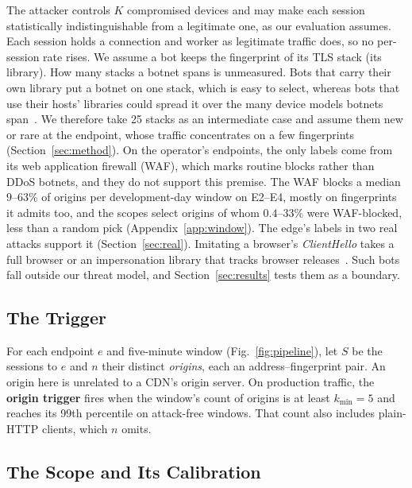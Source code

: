 \documentclass[conference,letterpaper,10pt]{IEEEtran}
\newcommand\1{\textit{(i)}}
\newcommand\2{\textit{(ii)}}
\newcommand\3{\textit{(iii)}}
\newcommand\4{\textit{(iv)}}
\newcommand\5{\textit{(v)}}
\newcommand\6{\textit{(vi)}}
\newcommand\7{\textit{(vii)}}
\newcommand\8{\textit{(viii)}}
\newcommand\9{\textit{(ix)}}
\begin{document}
The attacker controls $K$ compromised devices and
may make each session statistically indistinguishable
from a legitimate one, as our evaluation assumes. Each session holds a connection and worker as
legitimate traffic does, so no per-session rate rises. We assume a bot keeps the fingerprint of its TLS stack (its library). How many stacks a botnet spans is unmeasured. Bots that carry their own library put a botnet on one stack, which is easy to select, whereas bots that use their hosts' libraries could spread it over the many device models botnets span~\cite{antonakakis2017mirai}. We therefore take 25 stacks as an intermediate case and assume them new or rare at the endpoint, whose traffic concentrates on a few fingerprints (Section~\ref{sec:method}). On the operator's endpoints, the only labels come from its web application firewall (WAF), which marks routine blocks rather than DDoS botnets, and they do not support this premise. The WAF blocks a median $9$--$63\%$ of origins per development-day window on E2--E4, mostly on fingerprints it admits too, and the scopes select origins of whom $0.4$--$33\%$ were WAF-blocked, less than a random pick (Appendix~\ref{app:window}). The edge's labels in two real attacks support it (Section~\ref{sec:real}).
Imitating a browser's \textit{ClientHello} takes a full
browser or an impersonation library that tracks browser releases~\cite{frolov2019tls}. Such bots fall outside our threat model, and Section~\ref{sec:results} tests them as a boundary.

\subsection{The Trigger}
\label{sec:rule}

For each endpoint $e$ and five-minute window (Fig.~\ref{fig:pipeline}), let $S$ be the sessions to $e$ and $n$ their distinct \textit{origins}, each an address--fingerprint pair. An origin here is unrelated to a CDN's origin server.
On production traffic, the \textbf{origin trigger} fires when the window's count of origins is at least $k_{\min}=5$ and reaches its 99th percentile on attack-free windows. That count also includes plain-HTTP clients, which $n$ omits.



\subsection{The Scope and Its Calibration}
\label{sec:evidence}
\end{document}
